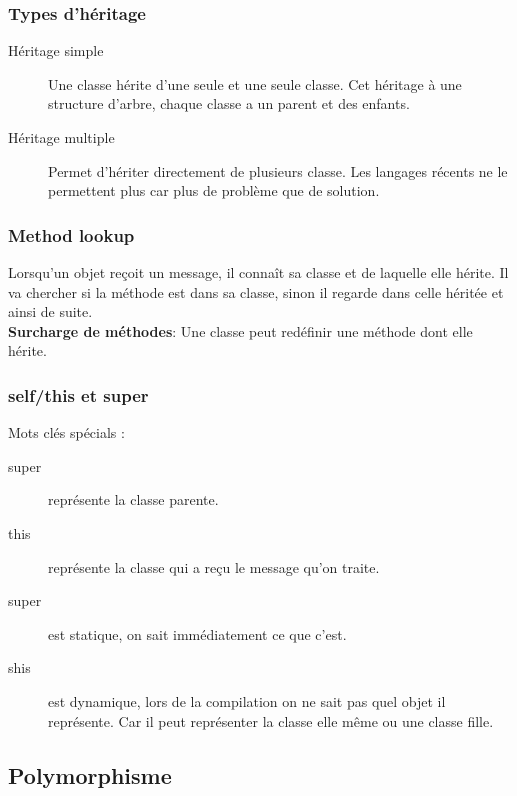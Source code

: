 \subsubsection{Types d’héritage}
\begin{description}
	\item [Héritage simple] Une classe hérite d’une seule et une seule classe. Cet héritage à une structure d’arbre, chaque classe a un parent et des enfants.
	\item [Héritage multiple] Permet d’hériter directement de plusieurs classe. Les langages récents ne le permettent plus car plus de problème que de solution.
\end{description}



\subsubsection{Method lookup}
Lorsqu’un objet reçoit un message, il connaît sa classe et de laquelle elle hérite. Il va chercher si la méthode est dans sa classe, sinon il regarde dans celle héritée et ainsi de suite.
\\\textbf{Surcharge de méthodes}: Une classe peut redéfinir une méthode dont elle hérite.



\subsubsection{self/this et super}
Mots clés spécials :
\begin{description}
    \item [super] représente la classe parente.
	\item [this] représente la classe qui a reçu le message qu’on traite.

	\item [super] est statique, on sait immédiatement ce que c’est.
	\item [shis] est dynamique, lors de la compilation on ne sait pas quel objet il représente. Car il peut représenter la classe elle même ou une classe fille.
\end{description}



\subsection{Polymorphisme}




